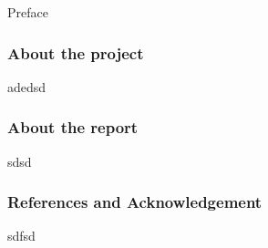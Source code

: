 Preface
\subsubsection*{About the project}
adedsd
\subsubsection*{About the report}
sdsd
\subsubsection*{References and Acknowledgement}
sdfsd
